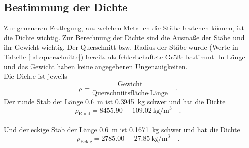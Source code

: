\subsection{Bestimmung der Dichte}
Zur genaueren Festlegung, aus welchen Metallen die Stäbe bestehen können, ist die Dichte wichtig. Zur Berechnung der Dichte sind die Ausmaße der Stäbe und ihr Gewicht wichtig.
Der Querschnitt bzw. Radius der Stäbe wurde (Werte in Tabelle \ref{tab:querschnitte}) bereits als fehlerbehaftete Größe bestimmt. In Länge und das Gewicht haben keine angegebenen Ungenauigkeiten. \\
Die Dichte ist jeweils
\begin{equation}
  \rho = \frac{\text{Gewicht}}{\text{Querschnittsfläche} \cdot \text{Länge}} \quad.
\end{equation}
Der runde Stab der Länge \SI{0.6}{\metre} ist \SI{0.3945}{\kilo\gram} schwer und hat die Dichte
\begin{equation}
  \rho_\text{Rund} = \SI{8455.90(10902)}{\kilo\gram\per\cubic\metre} \quad.
\end{equation}  \\
Und der eckige Stab der Länge \SI{0.6}{\metre} ist \SI{0.1671}{\kilo\gram} schwer und hat die Dichte
\begin{equation}
  \rho_\text{Eckig} = \SI{2785.00(2785)}{\kilo\gram\per\cubic\metre} \quad.
\end{equation}
